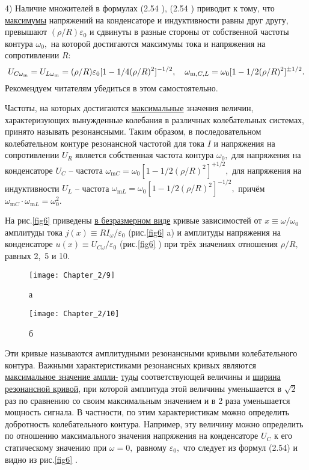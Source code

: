 {4) Наличие множителей   в формулах (2.54 ), (2.54 ) приводит к тому, что \underline{максимумы} напряжений на конденсаторе и индуктивности равны друг другу, превышают $(\rho/R)\varepsilon_0$ и сдвинуты в разные стороны от собственной частоты контура $\omega_0,$ на которой достигаются максимумы тока и напряжения на сопротивлении $R:$
{\large
\begin{equation}\eqmark{2.57}
	U_{C\omega_\text{m}}=U_{L\omega_\text{m}}=(\rho/R)\varepsilon_0[1-1/4(\rho/R)^2]^{-1/2},~~~\omega_{\text{m},C,L}=\omega_0[1-1/2(\rho/R)^2]^{\pm1/2}.
\end{equation}}
Рекомендуем читателям убедиться в этом самостоятельно.

Частоты, на которых достигаются \underline{максимальные} значения величин, характеризующих вынужденные колебания в различных колебательных системах, принято называть \textsf{резонансными.} Таким образом, в последовательном колебательном контуре резонансной частотой для тока $I$ и напряжения на сопротивлении $U_R$ является собственная частота контура $\omega_0,$ для напряжения на конденсаторе $U_C$ – частота $\omega_{\text{m}C}=\omega_0[1-1/2(\rho/R)^2]^{+1/2},$ для напряжения на индуктивности $U_L$ – частота $\omega_{\text{m}L}=\omega_0[1-1/2(\rho/R)^2]^{-1/2},$ причём $\omega_{\text{m}C}\cdot\omega_{\text{m}L}=\omega_0^2.$
	
На рис.\ref{fig6} приведены \underline{в безразмерном виде} кривые зависимостей от $x\equiv\omega/\omega_0$ амплитуды тока $j(x)\equiv RI_\omega/\varepsilon_0$ (рис.\ref{fig6} a) и амплитуды напряжения на конденсаторе $u(x)\equiv U_{C\omega}/\varepsilon_0$  (рис.\ref{fig6} ) при трёх значениях отношения $\rho/R,$ равных 2,~5 и 10.

\begin{figure}[h]
	\begin{center}
		\begin{minipage}[h]{0.45\linewidth}
			\texttt{[image: Chapter\_2/9]}
			\caption{а} 
			\label{fig6} 
		\end{minipage}
		\hfill
		\setcounter{figure}{5}
		\begin{minipage}[h]{0.45\linewidth}
			\texttt{[image: Chapter\_2/10]}
			\caption{б}
			\label{fig9}
		\end{minipage}
	\end{center}
\end{figure}

Эти кривые называются \textsf{амплитудными резонансными кривыми} колебательного контура. Важными характеристиками резонансных кривых являются \underline{максимальное значение ампли-} \underline{туды} соответствующей величины и \underline{ширина резонансной кривой}, при которой амплитуда этой величины уменьшается в $\sqrt{2}$ раз по сравнению со своим максимальным значением и в 2 раза уменьшается мощность сигнала. В частности, по этим характеристикам можно определить добротность колебательного контура. Например, эту величину можно определить по отношению максимального значения напряжения на конденсаторе $U_C$ к его статическому значению при $\omega=0,$ равному $\varepsilon_0,$ что следует из формул (2.54) и видно из рис.\ref{fig6} .

}
